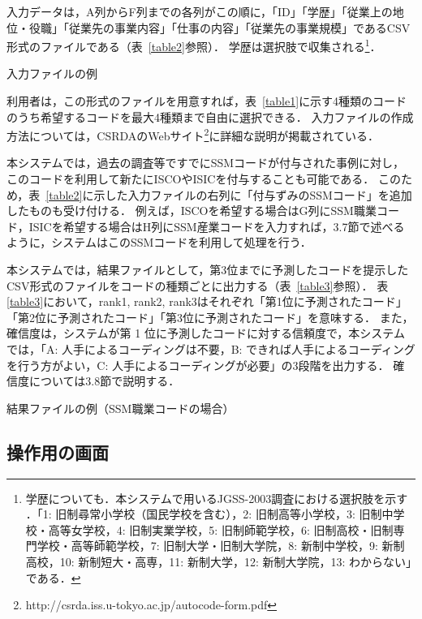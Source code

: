 \documentclass[japanese]{jnlp_1.4}
\begin{document}
入力データは，A列からF列までの各列がこの順に，「ID」「学歴」「従業上の地位・役職」「従業先の事業内容」「仕事の内容」「従業先の事業規模」であるCSV形式のファイルである（表~\ref{table2}参照）．
学歴は選択肢で収集される\footnote{学歴についても．本システムで用いるJGSS-2003調査における選択肢を示す \cite{JGSS05}．「1: 旧制尋常小学校（国民学校を含む），2: 旧制高等小学校，3: 旧制中学校・高等女学校，4: 旧制実業学校，5: 旧制師範学校，6: 旧制高校・旧制専門学校・高等師範学校，7: 旧制大学・旧制大学院，8: 新制中学校，9: 新制高校，10: 新制短大・高専，11: 新制大学，12: 新制大学院，13: わからない」である．}． 

\begin{table}[b]
\caption{入力ファイルの例}
\label{table2}

\end{table}

利用者は，この形式のファイルを用意すれば，表~\ref{table1}に示す4種類のコードのうち希望するコードを最大4種類まで自由に選択できる．
入力ファイルの作成方法については，CSRDAのWebサイト\footnote{http://csrda.iss.u-tokyo.ac.jp/autocode-form.pdf}に詳細な説明が掲載されている． 

本システムでは，過去の調査等ですでにSSMコードが付与された事例に対し，このコードを利用して新たにISCOやISICを付与することも可能である．
このため，表~\ref{table2}に示した入力ファイルの右列に「付与ずみのSSMコード」を追加したものも受け付ける．
例えば，ISCOを希望する場合はG列にSSM職業コード，ISICを希望する場合はH列にSSM産業コードを入力すれば，3.7節で述べるように，システムはこのSSMコードを利用して処理を行う．

本システムでは，結果ファイルとして，第3位までに予測したコードを提示したCSV形式のファイルをコードの種類ごとに出力する（表~\ref{table3}参照）．
表\ref{table3}において，rank1, rank2, rank3はそれぞれ「第1位に予測されたコード」「第2位に予測されたコード」「第3位に予測されたコード」を意味する．
また，確信度は，システムが第 1 位に予測したコードに対する信頼度で，本システムでは，「A: 人手によるコーディングは不要，B: できれば人手によるコーディングを行う方がよい，C: 人手によるコーディングが必要」の3段階を出力する．
確信度については3.8節で説明する．

\begin{table}[t]
\caption{結果ファイルの例（SSM職業コードの場合）}
\label{table3}

\end{table}


\subsection{操作用の画面}
\end{document}
